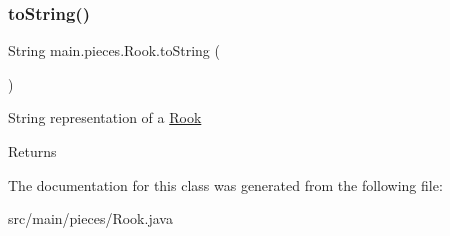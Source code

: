 \subsubsection{\texorpdfstring{to\+String()}{toString()}}
{\footnotesize\ttfamily String main.\+pieces.\+Rook.\+to\+String (\begin{DoxyParamCaption}{ }\end{DoxyParamCaption})}

String representation of a \hyperlink{classmain_1_1pieces_1_1_rook}{Rook} \begin{DoxyReturn}{Returns}

\end{DoxyReturn}


The documentation for this class was generated from the following file\+:\begin{DoxyCompactItemize}
\item 
src/main/pieces/Rook.\+java\end{DoxyCompactItemize}
